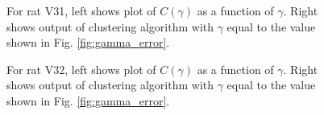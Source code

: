 \documentclass[superscriptaddress, twocolumn, prl]{revtex4}
\begin{document}
\begin{figure}
\centering
{}
\caption{For rat V31, left shows plot of $C\left(\gamma \right)$ as a function of $\gamma$. Right shows output of clustering algorithm with $\gamma$ equal to the value shown in Fig. \ref{fig:gamma_error}.}
\end{figure}

\begin{figure}
\centering
{}
\caption{For rat V32, left shows plot of $C\left(\gamma \right)$ as a function of $\gamma$. Right shows output of clustering algorithm with $\gamma$ equal to the value shown in Fig. \ref{fig:gamma_error}.}
\end{figure}
\end{document}

